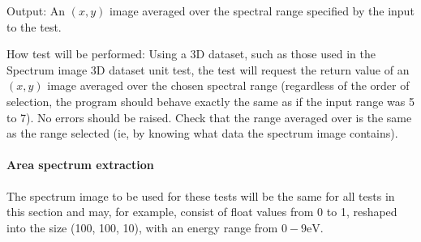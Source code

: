\documentclass[12pt, titlepage]{article}
\begin{document}
\begin{enumerate}
Output: An $(x,y)$ image averaged over the spectral range specified by the input to the test.

How test will be performed: Using a 3D dataset, such as those used in the Spectrum image 3D dataset unit test, the test will request the return value of an $(x,y)$ image averaged over the chosen spectral range (regardless of the order of selection, the program should behave exactly the same as if the input range was 5 to 7). No errors should be raised. Check that the range averaged over is the same as the range selected (ie, by knowing what data the spectrum image contains).

\end{enumerate}

\paragraph{Area spectrum extraction}

The spectrum image to be used for these tests will be the same for all tests in this section and may, for example, consist of float values from 0 to 1, reshaped into the size (100, 100, 10), with an energy range from $0-9 \si{\electronvolt}$.
\end{document}
